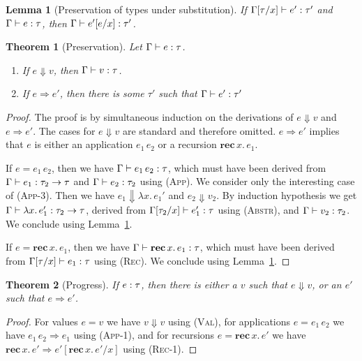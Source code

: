 \documentclass[12pt,a2paper,draft]{article}
\newcommand{\abstr}[2]{\ensuremath{\lambda{#1}.\,{#2}}}
\newcommand{\app}[2]{\ensuremath{{#1}\,{#2}}}
\newcommand{\rec}[2]{\ensuremath{\textbf{rec}\,{#1}.\,{#2}}}
\newcommand{\tj}[2]{\mbox{\ensuremath{{#1}:{#2}}}}
\newcommand{\Tj}[3]{\mbox{\ensuremath{{#1}\vdash\tj{#2}{#3}}}}
\newtheorem{lemma}{Lemma}
\newtheorem{theorem}{Theorem}
\begin{document}
\begin{lemma}[Preservation of types under substitution]
  \label{lemma:Preservation_of_types_under_substitution}
  If $\Tj{\Gamma[\tau/x]}{e'}{\tau'}$ and $\Tj{\Gamma}{e}{\tau}$,
  then $\Tj{\Gamma}{e'[e/x]}{\tau'}$.
\end{lemma}

\begin{theorem}[Preservation]
  \label{theorem:Preservation}
  Let $\Tj{\Gamma}{e}{\tau}$.
  \begin{enumerate}
  \item If $e \Downarrow v$, then $\Tj{\Gamma}{v}{\tau}$.
  \item If $e \Rightarrow e'$, then there is some $\tau'$ such that $\Tj{\Gamma}{e'}{\tau'}$
  \end{enumerate}
\end{theorem}

\begin{proof}
  The proof is by simultaneous induction on the derivations of $e \Downarrow v$ and $e \Rightarrow e'$.
  The cases for $e \Downarrow v$ are standard and therefore omitted.
  $e \Rightarrow e'$ implies that $e$ is either an application $\app{e_1}{e_2}$ or
  a recursion $\rec{x}{e_1}$.

  If $e = \app{e_1}{e_2}$, then we have $\Tj{\Gamma}{\app{e_1}{e_2}}{\tau}$, which
  must have been derived from $\Tj{\Gamma}{e_1}{\tau_2 \to \tau}$ and $\Tj{\Gamma}{e_2}{\tau_2}$
  using \textsc{(App)}. We consider only the interesting case of \textsc{(App-3)}. Then we have
  $e_1 \Downarrow \abstr{x}{e_1'}$ and $e_2 \Downarrow v_2$. By
  induction hypothesis we get $\Tj{\Gamma}{\abstr{x}{e_1'}}{\tau_2 \to \tau}$, derived from
  $\Tj{\Gamma[\tau_2/x]}{e_1'}{\tau}$ using \textsc{(Abstr)}, and $\Tj{\Gamma}{v_2}{\tau_2}$.
  We conclude using Lemma~\ref{lemma:Preservation_of_types_under_substitution}.

  If $e = \rec{x}{e_1}$, then we have $\Tj{\Gamma}{\rec{x}{e_1}}{\tau}$, which must have
  been derived from $\Tj{\Gamma[\tau/x]}{e_1}{\tau}$ using \textsc{(Rec)}.
  We conclude using Lemma~\ref{lemma:Preservation_of_types_under_substitution}.
\end{proof}

\begin{theorem}[Progress]
  \label{theorem:Progress}
  If $\tj{e}{\tau}$, then there is either a $v$ such that $e \Downarrow v$, or an $e'$ such that
  $e \Rightarrow e'$.
\end{theorem}

\begin{proof}
  For values $e = v$ we have $v \Downarrow v$ using \textsc{(Val)}, for applications
  $e = \app{e_1}{e_2}$ we have $\app{e_1}{e_2} \Rightarrow e_1$ using \textsc{(App-1)},
  and for recursions $e = \rec{x}{e'}$ we have $\rec{x}{e'} \Rightarrow e'[\rec{x}{e'}/x]$
  using \textsc{(Rec-1)}.
\end{proof}
\end{document}
